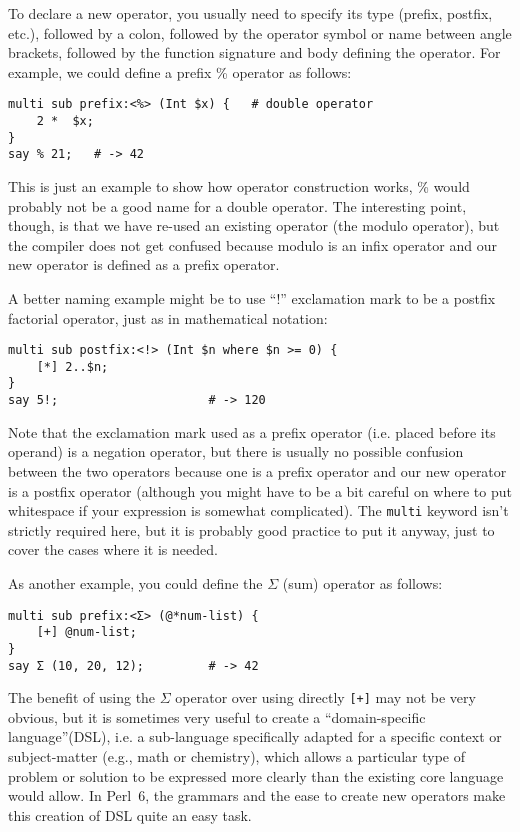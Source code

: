 To declare a new operator, you usually need to specify 
its type (prefix, postfix, etc.), followed by a colon, 
followed by the operator symbol or name between angle brackets, 
followed by the function signature and body defining 
the operator. For example, we could define a prefix \% 
operator as follows:

\begin{verbatim}
multi sub prefix:<%> (Int $x) {   # double operator
    2 *  $x;
}
say % 21;   # -> 42
\end{verbatim}

This is just an example to show how operator construction works, \% would 
probably not be a good name for a double operator. The 
interesting point, though, is that we have re-used an existing 
operator (the modulo operator), but the compiler does not 
get confused because modulo is an infix operator and our 
new operator is defined as a prefix operator.

A better naming example might be to use ``!'' exclamation 
mark to be a postfix factorial operator, just as in 
mathematical notation:

\begin{verbatim}
multi sub postfix:<!> (Int $n where $n >= 0) {
    [*] 2..$n;
}
say 5!;                     # -> 120
\end{verbatim}

Note that the exclamation mark used as a prefix 
operator (i.e. placed before its operand) is 
a negation operator, but there is usually no possible 
confusion between the two operators because one is a 
prefix operator and our new operator is a postfix operator 
(although you might have to be a bit careful on where 
to put whitespace if your expression is somewhat 
complicated). The {\tt multi} keyword isn't strictly 
required here, but it is probably good practice to 
put it anyway, just to cover the cases where it is 
needed. 

As another example, you could define the $\Sigma$ (sum) 
operator as follows:

\begin{verbatim}
multi sub prefix:<Σ> (@*num-list) {
    [+] @num-list;
}
say Σ (10, 20, 12);         # -> 42
\end{verbatim}

The benefit of using the $\Sigma$ operator over using 
directly \verb'[+]' may not be very obvious, but it is 
sometimes very useful to create a ``domain-specific 
language''(DSL), i.e. a sub-language specifically 
adapted for a specific context or subject-matter (e.g., math 
or chemistry), which allows a particular type of problem 
or solution to be expressed more clearly than the 
existing core language would allow. In Perl~6, the 
grammars and the ease to create new operators make 
this creation of DSL quite an easy task.


